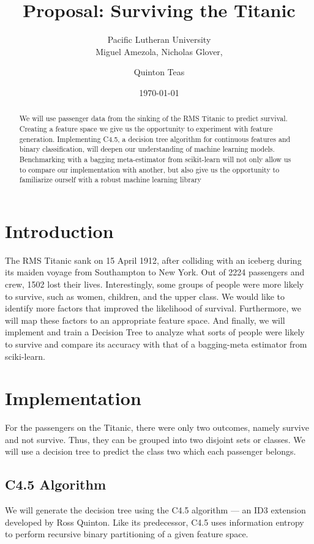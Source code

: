 \documentclass[12pt]{amsproc}
\title{Proposal: Surviving the Titanic}
\author{
	Pacific Lutheran University  \\
	Miguel Amezola,
	Nicholas Glover,
	\and Quinton Teas
}
\date{\today}
\theoremstyle{definition}
\begin{document}
	
	\maketitle
		
	\begin{abstract}
	We will use passenger data from the sinking of the RMS Titanic to predict survival. Creating a feature space we give us the opportunity to experiment with feature generation. Implementing C4.5, a decision tree algorithm for continuous features and binary classification, will deepen our understanding of machine learning models. Benchmarking with a bagging meta-estimator from scikit-learn will not only allow us to compare our implementation with another, but also give us the opportunity to familiarize ourself with a robust machine learning library
	\end{abstract}
	
	\section{Introduction}\label{intro}
	The RMS Titanic sank on 15 April 1912, after colliding with an iceberg during its maiden voyage from Southampton to New York. Out of 2224 passengers and crew, 1502 lost their lives. Interestingly, some groups of people were more likely to survive, such as women, children, and the upper class. We would like to identify more factors that improved the likelihood of survival. Furthermore, we will map these factors to an appropriate feature space. And finally, we will implement and train a Decision Tree to analyze what sorts of people were likely to survive and compare its accuracy with that of a bagging-meta estimator from sciki-learn.
	
	\section{Implementation}\label{implementation}
	
	For the passengers on the Titanic, there were only two outcomes, namely survive and not survive. Thus, they can be grouped into two disjoint sets or classes. We will use a decision tree to predict the class two which each passenger belongs.
	
	\subsection{C4.5 Algorithm}\label{C4.5 Algorithm}
	We will generate the decision tree using the C4.5 algorithm --- an ID3 extension developed by Ross Quinton.
	Like its predecessor, C4.5 uses information entropy to perform recursive binary partitioning of a given feature space. 
		
\end{document}

